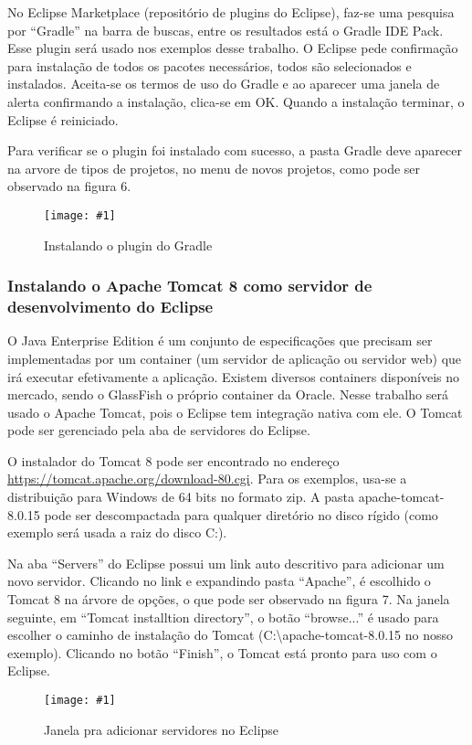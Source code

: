 \documentclass[a4paper,12pt]{article}
\newcommand{\figura}[2] {
	\begin{figure}[H]
		\centering
		\texttt{[image: \#1]}
		\caption{#2}
	\end{figure}
	\FloatBarrier
}
\begin{document}
No Eclipse Marketplace (repositório de plugins do Eclipse), faz-se uma pesquisa por “Gradle” na barra de buscas, entre os resultados está o Gradle IDE Pack. Esse plugin será usado nos exemplos desse trabalho. O Eclipse pede confirmação para instalação de todos os pacotes necessários, todos são selecionados e instalados. Aceita-se os termos de uso do Gradle e ao aparecer uma janela de alerta confirmando a instalação, clica-se em OK. Quando a instalação terminar, o Eclipse é reiniciado.

Para verificar se o plugin foi instalado com sucesso, a pasta Gradle deve aparecer na arvore de tipos de projetos, no menu de novos projetos, como pode ser observado na figura 6.

\figura{plugin1.png}{Instalando o plugin do Gradle}

\subsubsection{Instalando o Apache Tomcat 8 como servidor de desenvolvimento do Eclipse} 

O Java Enterprise Edition é um conjunto de especificações que precisam ser implementadas por um container (um servidor de aplicação ou servidor web) que irá executar efetivamente a aplicação. Existem diversos containers disponíveis no mercado, sendo o GlassFish o próprio container da Oracle. Nesse trabalho será usado o Apache Tomcat, pois o Eclipse tem integração nativa com ele. O Tomcat pode ser gerenciado pela aba de servidores do Eclipse.

O instalador do Tomcat 8 pode ser encontrado no endereço \url{https://tomcat.apache.org/download-80.cgi}. Para os exemplos, usa-se a distribuição para Windows de 64 bits no formato zip. A pasta apache-tomcat-8.0.15 pode ser descompactada para qualquer diretório no disco rígido (como exemplo será usada a raiz do disco C:).  

Na aba “Servers” do Eclipse possui um link auto descritivo para adicionar um novo servidor. Clicando no link e expandindo pasta “Apache”, é escolhido o Tomcat 8 na árvore de opções, o que pode ser observado na figura 7. Na janela seguinte, em “Tomcat installtion directory”, o botão “browse...” é usado para escolher o caminho de instalação do Tomcat (C:\textbackslash apache-tomcat-\textmd{8.0.15} no nosso exemplo). Clicando no botão “Finish”, o Tomcat está pronto para uso com o Eclipse. 

\figura{tomcat1.png}{Janela pra adicionar servidores no Eclipse}
\end{document}
